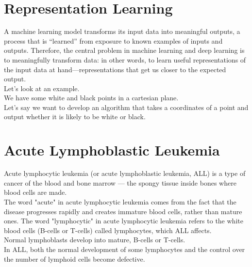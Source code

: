 \documentclass{SBCbookchapter}
\begin{document}
\section*{Representation Learning}
A machine learning model transforms its input data
into meaningful outputs, a process that is “learned” 
from exposure to known examples of inputs and outputs. 
Therefore,  the  central  problem  in  machine  learning
and  deep  learning  is  to meaningfully transform  data:
in  other  words,  to  learn  useful representations
of  the  input  data  at hand—representations that 
get us closer to the expected output. \\
Let's look at an example. \\
We have some white and black points in a cartesian plane. \\
Let's say we want to develop an algorithm that takes a coordinates
of a point and output whether it is likely to be white or black. \\

\section*{Acute Lymphoblastic Leukemia}
Acute lymphocytic leukemia (or acute lymphoblastic leukemia, ALL)
is a type of cancer of the blood and bone marrow — 
the spongy tissue inside bones where blood cells are made. \\
The word "acute" in acute lymphocytic leukemia comes
from the fact that the disease progresses rapidly and
creates immature blood cells, rather than mature ones.
The word "lymphocytic" in acute lymphocytic leukemia 
refers to the white blood cells (B-cells or T-cells) called lymphocytes, 
which ALL affects. \\
Normal lymphoblasts develop into mature, B-cells or T-cells.\\
In ALL, both the normal development of some 
lymphocytes and the control over the number of 
lymphoid cells become defective.
\end{document}

